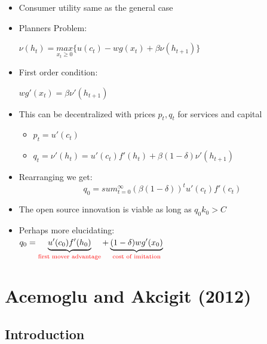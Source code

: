 \documentclass{beamer}
\begin{document}
\begin{frame}
  \begin{itemize}
    \item Consumer utility same as the general case
    \item Planners Problem:\\ 
    \begin{centering}
      $\nu(h_t) = \underset{x_t \ge 0}{max} \{u(c_t) - wg(x_t) + \beta\nu(h_{t+1})\}$
    \end{centering}
    \item First order condition:\\
    \begin{centering}
      $wg'(x_t) = \beta\nu'(h_{t+1})$
    \end{centering}
    \item This can be decentralized with prices ${p_t, q_t}$ for services and capital
    \begin{itemize}
    \item $p_t = u'(c_t)$
    \item $q_t = \nu'(h_t) = u'(c_t)f'(h_t) + \beta(1-\delta)\nu'(h_{t+1})$ 
    \end{itemize} 
  \end{itemize}
\end{frame}

\begin{frame}
  \begin{itemize}
    \item Rearranging we get:
    \begin{equation*}
       q_0 = sum_{t=0}^\infty(\beta(1-\delta))^tu'(c_t)f'(c_t)
    \end{equation*}
     \item The open source innovation is viable as long as $q_0k_0 > C$
     \item Perhaps more elucidating:\\
     $q_0 = \underbrace{u'(c_0)f'(h_0)}_{\text{\color{red}first mover advantage}} + \underbrace{(1-\delta)wg'(x_0)}_{\text{\color{red}cost of imitation}}$  
  \end{itemize}
\end{frame}


\section{Acemoglu and Akcigit (2012)}
\label{sec:acemoglu_and_akcigit_2012}

\subsection{Introduction}
\label{sub:introduction}
\end{document}
